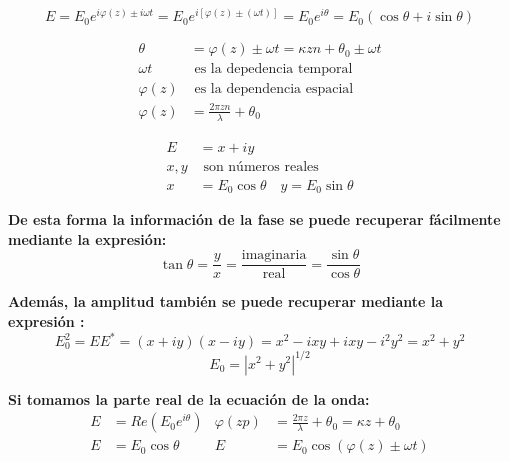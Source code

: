\documentclass[12pt]{article}
\begin{document}
	\begin{equation*}
		E = E_0 e^{i\varphi(z) \pm i\omega t} = E_0 e^{i[\varphi(z) \pm (\omega t)]} = E_0 e^{i\theta} = E_0 (\cos\theta + i\sin\theta)
	\end{equation*}
	
	\begin{minipage}{0.5\textwidth}
		\begin{align*}
			\theta &= \varphi(z) \pm \omega t = \kappa z n + \theta_0 \pm \omega t \\
			\omega t &\text{ es la depedencia temporal} \\
			\varphi(z) &\text{ es la dependencia espacial} \\
			\varphi(z) &= \frac{2\pi z n}{\lambda} + \theta_0
		\end{align*}
	\end{minipage}
	\hfill
	\begin{minipage}{0.45\textwidth}
		\begin{align*}
			E &= x + iy \\
			x, y &\text{ son números reales} \\
			x &= E_0 \cos\theta \quad y = E_0 \sin\theta
		\end{align*}
	\end{minipage}
	
	\vspace{0.5cm}
	\textbf{De esta forma la información de la fase se puede recuperar fácilmente mediante la expresión:}
	\begin{equation*}
		\tan\theta = \frac{y}{x} = \frac{\text{imaginaria}}{\text{real}} = \frac{\sin\theta}{\cos\theta}
	\end{equation*}
	
	\textbf{Además, la amplitud también se puede recuperar mediante la expresión :}
	\begin{equation*}
		E_0^2 = E E^* = (x+iy)(x-iy) = x^2 - ixy + ixy - i^2 y^2 = x^2 + y^2
	\end{equation*}
	\begin{equation*}
		E_0 = |x^2 + y^2|^{1/2}
	\end{equation*}
	
	\textbf{Si tomamos la parte real de la ecuación de la onda:}
	\begin{align*}
		E &= Re(E_0 e^{i\theta}) & \varphi(zp) &= \frac{2\pi z}{\lambda} + \theta_0 = \kappa z + \theta_0 \\
		E &= E_0 \cos\theta & E &= E_0 \cos(\varphi(z) \pm \omega t)
	\end{align*}
	
\end{document}
